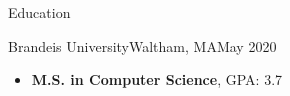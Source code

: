 \documentclass[]{mcdowellcv}
\begin{document}
	\makeheader
	
\begin{cvsection}{Education}
		\begin{cvsubsection}{Brandeis University}{Waltham, MA}{May 2020}
			\begin{itemize}
				\item \textbf{M.S. in Computer Science}, GPA: 3.7
			\end{itemize}
		\end{cvsubsection}
	\end{cvsection}
 
\end{document}
